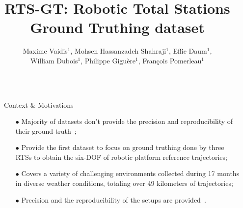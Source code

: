 \documentclass[final,hyperref={pdfpagelabels=false}]{beamer}
\title{\huge RTS-GT: Robotic Total Stations Ground Truthing dataset} %
\author{\normalsize Maxime Vaidis$^{1}$, 
Mohsen Hassanzadeh Shahraji$^{1}$, 
Effie Daum$^{1}$, 
\\William Dubois$^{1}$,
Philippe Giguère$^{1}$, 
François Pomerleau$^{1}$} %
\institute{\small$^1$ Northern Robotics Laboratory, Universit\'e Laval} %
\begin{document}

\begin{frame}[t] %

\begin{columns}[t] %

\begin{column}{.0125\textwidth}\end{column} %

\begin{column}{.465\textwidth} %

\vspace{-12.5mm}
\begin{block}{Context \& Motivations}
\begin{itemize}
    \item[\textbf{$\bullet$}] Majority of datasets don't provide the precision and reproducibility of their ground-truth~\cite{KITTI2012, UZH2019};
    \item[\textbf{$\bullet$}] Provide the first dataset to focus on ground truthing done by three \acp{RTS} to obtain the six-\ac{DOF} of robotic platform reference trajectories;
    \item[\textbf{$\bullet$}] Covers a variety of challenging environments collected during \num{17} months in diverse weather conditions, totaling over \num{49} kilometers of trajectories;
    \item[\textbf{$\bullet$}] Precision and the reproducibility of the setups are provided~\cite{Vaidis2023Iros}.
\end{itemize}
\end{block}


\end{column}
\end{columns}
\end{frame}
\end{document}
